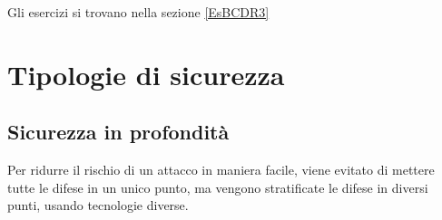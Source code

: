 Gli esercizi si trovano nella sezione \ref{EsBCDR3}

\section{Tipologie di sicurezza}

\subsection{Sicurezza in profondità}

Per ridurre il rischio di un attacco in maniera facile, viene evitato di 
mettere tutte le difese in un unico punto, ma vengono stratificate le difese in 
diversi punti, usando tecnologie diverse.